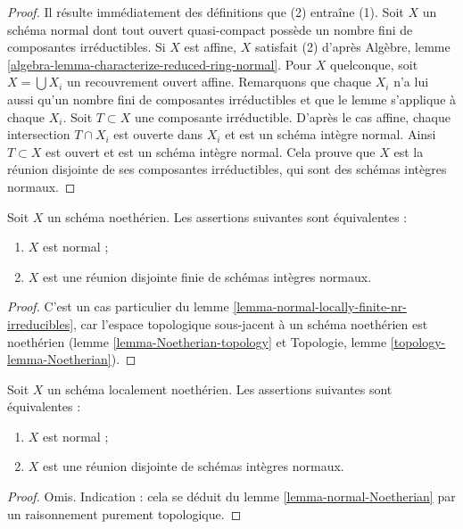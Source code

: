 \begin{proof}
Il résulte immédiatement des définitions que (2) entraîne (1).
Soit $X$ un schéma normal dont tout ouvert quasi-compact
possède un nombre fini de composantes irréductibles.
Si $X$ est affine, $X$ satisfait (2) d'après
Algèbre, lemme \ref{algebra-lemma-characterize-reduced-ring-normal}.
Pour $X$ quelconque, soit $X = \bigcup X_i$ un
recouvrement ouvert affine. Remarquons que chaque $X_i$ n'a lui aussi
qu'un nombre fini de composantes irréductibles et que le lemme s'applique
à chaque $X_i$. Soit $T \subset X$ une composante irréductible.
D'après le cas affine, chaque intersection $T \cap X_i$ est ouverte dans $X_i$
et est un schéma intègre normal.
Ainsi $T \subset X$ est ouvert et est un schéma intègre normal.
Cela prouve que $X$ est la réunion disjointe de ses composantes irréductibles,
qui sont des schémas intègres normaux.
\end{proof}

\begin{lemma}
\label{lemma-normal-Noetherian}
Soit $X$ un schéma noethérien.
Les assertions suivantes sont équivalentes :
\begin{enumerate}
\item $X$ est normal ;
\item $X$ est une réunion disjointe finie de schémas intègres normaux.
\end{enumerate}
\end{lemma}

\begin{proof}
C'est un cas particulier du
lemme \ref{lemma-normal-locally-finite-nr-irreducibles}, car l'espace topologique
sous-jacent à un schéma noethérien est noethérien
(lemme \ref{lemma-Noetherian-topology}
et
Topologie, lemme \ref{topology-lemma-Noetherian}).
\end{proof}

\begin{lemma}
\label{lemma-normal-locally-Noetherian}
Soit $X$ un schéma localement noethérien.
Les assertions suivantes sont équivalentes :
\begin{enumerate}
\item $X$ est normal ;
\item $X$ est une réunion disjointe de schémas intègres normaux.
\end{enumerate}
\end{lemma}

\begin{proof}
Omis. Indication : cela se déduit du
lemme \ref{lemma-normal-Noetherian} par un raisonnement purement topologique.
\end{proof}


